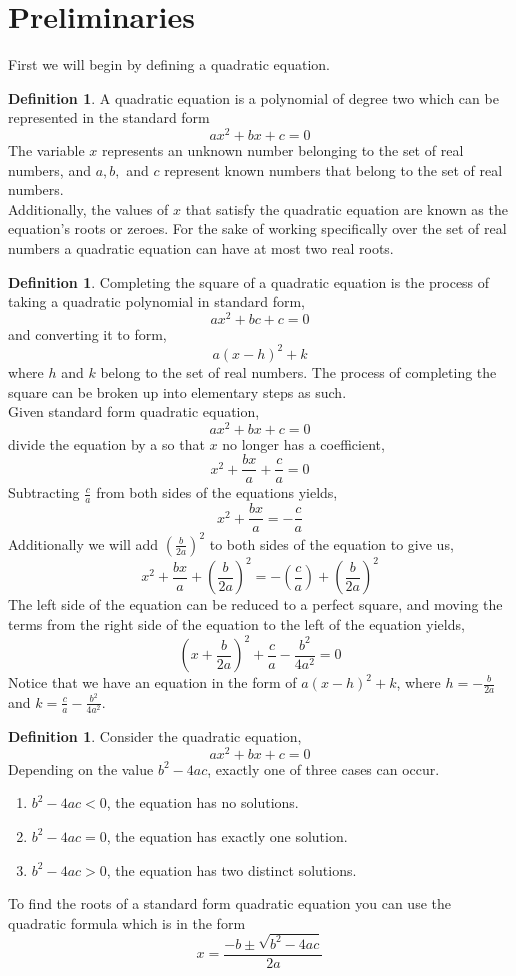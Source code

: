 \documentclass{article}
\theoremstyle{plain}
\theoremstyle{definition}
\newtheorem{defi}[thm]{Definition}
\begin{document}
\section{Preliminaries} \label{sect:prelims}
First we will begin by defining a quadratic equation.
    \begin{defi}\label{def:quadratic}
    A quadratic equation is a polynomial of degree two which can be represented in the standard form\hfill\\
    $$ax^2+bx+c=0$$
    The variable $x$ represents an unknown number belonging to the set of real numbers, and $a, b, $ and $c$ represent known numbers that belong to the set of real numbers.\\
    Additionally, the values of $x$ that satisfy the quadratic equation are known as the equation's roots or zeroes. For the sake of working specifically over the set of real numbers a quadratic equation can have at most two real roots.\\
    \end{defi}
    \begin{defi}\label{def:compSquare}
    Completing the square of a quadratic equation is the process of taking a quadratic polynomial in standard form,\\
    $$ax^2+bc+c=0$$
    and converting it to form,
    $$a(x-h)^2+k$$
    where $h$ and $k$ belong to the set of real numbers.
    The process of completing the square can be broken up into elementary steps as such.\\
    Given standard form quadratic equation, $$ax^2+bx+c=0$$
    divide the equation by a so that $x$ no longer has a coefficient, $$x^2+\frac{bx}{a}+\frac{c}{a}=0$$
    Subtracting $\frac{c}{a}$ from both sides of the equations yields, 
    $$x^2+\frac{bx}{a}=-\frac{c}{a}$$
    Additionally we will add $(\frac{b}{2a})^2$ to both sides of the equation to give us,
    $$x^2+\frac{bx}{a}+(\frac{b}{2a})^2= -(\frac{c}{a}) + (\frac{b}{2a})^2$$
    The left side of the equation can be reduced to a perfect square, and moving the terms from the right side of the equation to the left of the equation yields, 
    $$(x+\frac{b}{2a})^2+\frac{c}{a}-\frac{b^2}{4a^2}=0$$
    Notice that we have an equation in the form of $a(x-h)^2+k$, where $h = -\frac{b}{2a}$ and $k=\frac{c}{a} - \frac{b^2}{4a^2}$.
    \end{defi}
    \begin{defi}\label{def:quadraticEq}
    Consider the quadratic equation, $$ax^2+bx+c=0$$
    Depending on the value $b^2-4ac$, exactly one of three cases can occur.
    
    \begin{enumerate}
        \item $b^2-4ac < 0$, the equation has no solutions.
        \item $b^2-4ac =0$, the equation has exactly one solution.
        \item $b^2-4ac > 0$, the equation has two distinct solutions.
    \end{enumerate}
    
    To find the roots of a standard form quadratic equation you can use the quadratic formula which is in the form
    $$x=\frac{-b\pm\sqrt{b^2-4ac}}{2a}$$
    \end{defi}
\end{document}
